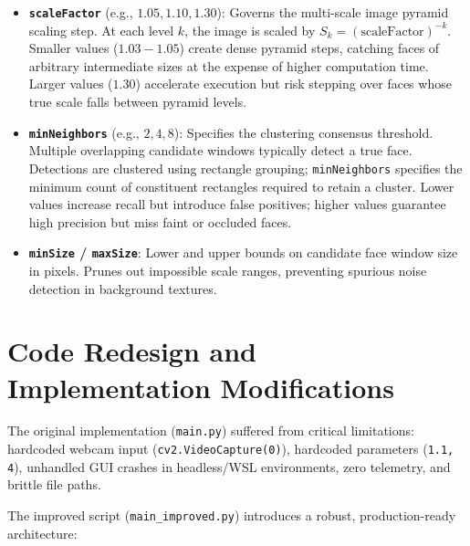 \documentclass[12pt]{article}
\begin{document}
\begin{itemize}
    \item \textbf{\texttt{scaleFactor}} (e.g., $1.05, 1.10, 1.30$): Governs the multi-scale image pyramid scaling step. At each level $k$, the image is scaled by $S_k = (\text{scaleFactor})^{-k}$. Smaller values ($1.03-1.05$) create dense pyramid steps, catching faces of arbitrary intermediate sizes at the expense of higher computation time. Larger values ($1.30$) accelerate execution but risk stepping over faces whose true scale falls between pyramid levels.
    
    \item \textbf{\texttt{minNeighbors}} (e.g., $2, 4, 8$): Specifies the clustering consensus threshold. Multiple overlapping candidate windows typically detect a true face. Detections are clustered using rectangle grouping; \texttt{minNeighbors} specifies the minimum count of constituent rectangles required to retain a cluster. Lower values increase recall but introduce false positives; higher values guarantee high precision but miss faint or occluded faces.
    
    \item \textbf{\texttt{minSize} / \texttt{maxSize}}: Lower and upper bounds on candidate face window size in pixels. Prunes out impossible scale ranges, preventing spurious noise detection in background textures.
\end{itemize}

\newpage

\section{Code Redesign and Implementation Modifications}

The original implementation (\texttt{main.py}) suffered from critical limitations: hardcoded webcam input (\texttt{cv2.VideoCapture(0)}), hardcoded parameters (\texttt{1.1, 4}), unhandled GUI crashes in headless/WSL environments, zero telemetry, and brittle file paths. 

The improved script (\texttt{main\_improved.py}) introduces a robust, production-ready architecture:
\end{document}
